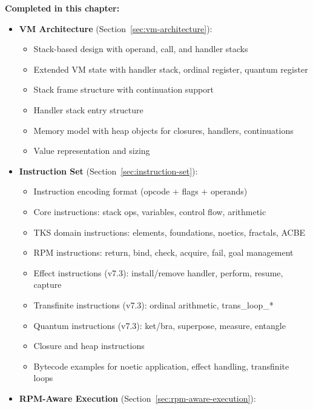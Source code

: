 \begin{tcolorbox}[colback=green!5!white,colframe=green!50!black,title=\textbf{Handoff: COMPILER-TASK-05 Complete},breakable]
\textbf{Completed in this chapter:}
\begin{itemize}
  \item \textbf{VM Architecture} (Section~\ref{sec:vm-architecture}):
    \begin{itemize}
      \item Stack-based design with operand, call, and handler stacks
      \item Extended VM state with handler stack, ordinal register, quantum register
      \item Stack frame structure with continuation support
      \item Handler stack entry structure
      \item Memory model with heap objects for closures, handlers, continuations
      \item Value representation and sizing
    \end{itemize}
  \item \textbf{Instruction Set} (Section~\ref{sec:instruction-set}):
    \begin{itemize}
      \item Instruction encoding format (opcode + flags + operands)
      \item Core instructions: stack ops, variables, control flow, arithmetic
      \item TKS domain instructions: elements, foundations, noetics, fractals, ACBE
      \item RPM instructions: return, bind, check, acquire, fail, goal management
      \item Effect instructions (v7.3): install/remove handler, perform, resume, capture
      \item Transfinite instructions (v7.3): ordinal arithmetic, trans\_loop\_*
      \item Quantum instructions (v7.3): ket/bra, superpose, measure, entangle
      \item Closure and heap instructions
      \item Bytecode examples for noetic application, effect handling, transfinite loops
    \end{itemize}
  \item \textbf{RPM-Aware Execution} (Section~\ref{sec:rpm-aware-execution}):

\end{itemize}
\end{tcolorbox}
